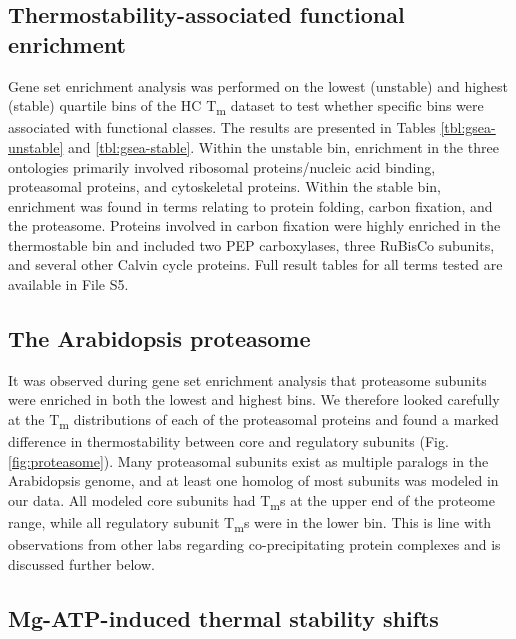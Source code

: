 \documentclass[11pt,letter]{article}\usepackage[]{graphicx}\usepackage[]{color}
\newcommand{\Tm}{T\textsubscript{m}}
\begin{document}
\subsection*{Thermostability-associated functional enrichment}

Gene set enrichment analysis was performed on the lowest (unstable) and
highest (stable) quartile bins of the HC \Tm{} dataset to test
whether specific bins were associated with functional classes. The results are
presented in Tables \ref{tbl:gsea-unstable} and \ref{tbl:gsea-stable}. Within
the unstable bin, enrichment in the three ontologies primarily involved
ribosomal proteins/nucleic acid binding, proteasomal proteins, and
cytoskeletal proteins. Within the stable bin, enrichment was found in terms
relating to protein folding, carbon fixation, and the proteasome. Proteins
involved in carbon fixation were highly enriched in the thermostable bin and
included two PEP carboxylases, three RuBisCo subunits, and several other
Calvin cycle proteins. Full result tables for all terms tested are available
in File S5.

\subsection*{The Arabidopsis proteasome}

It was observed during gene set enrichment analysis that proteasome subunits
were enriched in both the lowest and highest bins. We therefore looked
carefully at the \Tm{} distributions of each of the proteasomal proteins and
found a marked difference in thermostability between core and regulatory
subunits (Fig. \ref{fig:proteasome}). Many proteasomal subunits exist as
multiple paralogs in the Arabidopsis genome, and at least one homolog of most
subunits was modeled in our data. All modeled core subunits had \Tm{}s at the
upper end of the proteome range, while all regulatory subunit \Tm{}s were in
the lower bin. This is line with observations from other labs regarding
co-precipitating protein complexes and is discussed further below.

\subsection*{Mg-ATP-induced thermal stability shifts}
\end{document}
